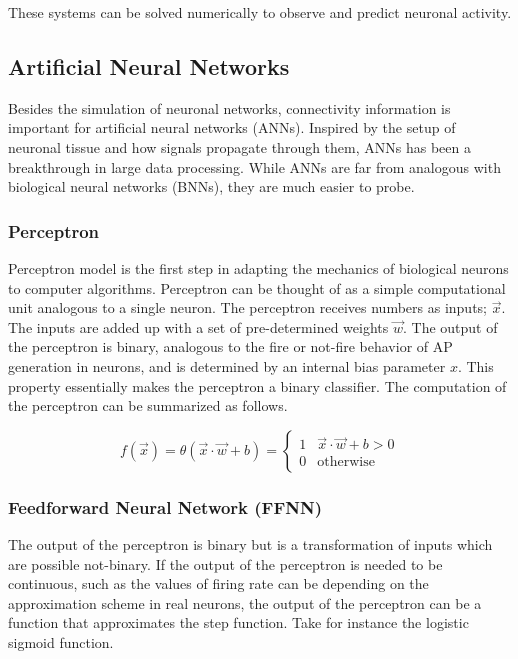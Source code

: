 \documentclass[../dissertation.tex]{subfiles}
\begin{document}
These systems can be solved numerically to observe and predict neuronal activity.

\subsection{Artificial Neural Networks}

Besides the simulation of neuronal networks, connectivity information is important for artificial neural networks (ANNs).
Inspired by the setup of neuronal tissue and how signals propagate through them, ANNs has been a breakthrough in large data processing.
While ANNs are far from analogous with biological neural networks (BNNs), they are much easier to probe.

\subsubsection{Perceptron}

Perceptron model is the first step in adapting the mechanics of biological neurons to computer algorithms.
Perceptron can be thought of as a simple computational unit analogous to a single neuron.
The perceptron receives numbers as inputs; $\vec{x}$.
The inputs are added up with a set of pre-determined weights $\vec{w}$.
The output of the perceptron is binary, analogous to the fire or not-fire behavior of AP generation in neurons, and is determined by an internal bias parameter $x$.
This property essentially makes the perceptron a binary classifier.
The computation of the perceptron can be summarized as follows.

\begin{equation}
    f \left( \vec{x} \right) = \theta(\vec{x} \cdot \vec{w} + b) =
    \begin{cases}
        1   &   \vec{x} \cdot \vec{w} + b > 0 \\
        0   &   \text{otherwise}
    \end{cases}
\end{equation}

\subsubsection{Feedforward Neural Network (FFNN)}

The output of the perceptron is binary but is a transformation of inputs which are possible not-binary.
If the output of the perceptron is needed to be continuous, such as the values of firing rate can be depending on the approximation scheme in real neurons, the output of the perceptron can be a function that approximates the step function.
Take for instance the logistic sigmoid function.
\end{document}
